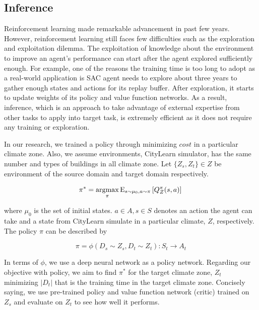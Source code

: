 \documentclass{article}
\DeclareMathOperator*{\argmax}{\arg\!\max}%
\begin{document}
\subsection{Inference}
\label{sec:TL}
Reinforcement learning made remarkable advancement in past few years. However, reinforcement learning still faces few difficulties such as the exploration and exploitation dilemma.\cite{zhu2021transfer} The exploitation of knowledge about the environment to improve an agent's performance can start after the agent explored sufficiently enough. For example, one of the reasons the training time is too long to adopt as a real-world application is SAC agent needs to explore about three years to gather enough states and actions for its replay buffer. After exploration, it starts to update weights of its policy and value function networks. As a result, inference, which is an approach to take advantage of external expertise from other tasks to apply into target task, is extremely efficient as it does not require any training or exploration.

In our research, we trained a policy through minimizing $cost$ in a particular climate zone. Also, we assume environments, CityLearn simulator, has the same number and types of buildings in all climate zone. Let $\{Z_s, Z_t\} \in Z$ be environment of the source domain and target domain respectively.

\begin{equation}
\label{eq:opt_policy}
    \pi^* = \argmax_\pi \mathrm{E}_{s \sim \mu_0, a \sim \pi}\left[ Q^\pi_Z(s, a)\right]\\
\end{equation}

where $\mu_0$ is the set of initial states. $a \in A, s \in S$ denotes an action the agent can take and a state from CityLearn simulate in a particular climate, $Z$, respectively. The policy $\pi$ can be described by 

\begin{equation}
\label{eq:policy_func}
    \pi = \phi(D_s \sim Z_s, D_t \sim Z_t): S_t \rightarrow A_t
\end{equation}

In terms of $\phi$, we use a deep neural network as a policy network. Regarding our objective with policy, we aim to find $\pi^*$ for the target climate zone, $ Z_t $ minimizing $|D_t|$ that is the training time in the target climate zone. Concisely saying, we use pre-trained policy and value function network (critic) trained on $Z_s$ and evaluate on $Z_t$ to see how well it performs.
\end{document}
